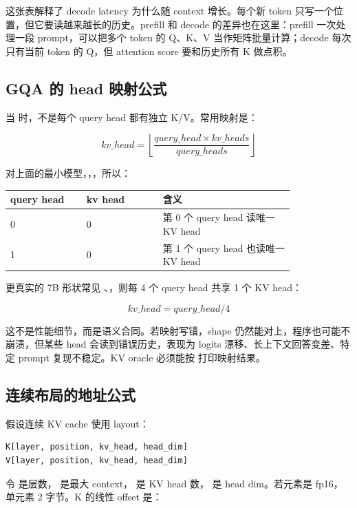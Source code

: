 这张表解释了 decode latency 为什么随 context 增长。每个新 token 只写一个位置，但它要读越来越长的历史。prefill 和 decode 的差异也在这里：prefill 一次处理一段 prompt，可以把多个 token 的 Q、K、V 当作矩阵批量计算；decode 每次只有当前 token 的 Q，但 attention score 要和历史所有 K 做点积。

\subsection{GQA 的 head 映射公式}

当  时，不是每个 query head 都有独立 K/V。常用映射是：

\[
kv\_head = \left\lfloor
  \frac{query\_head \times kv\_heads}{query\_heads}
\right\rfloor
\]

对上面的最小模型，，，所以：

\begin{center}
\begin{tabular}{p{0.22\linewidth}p{0.22\linewidth}p{0.38\linewidth}}
\toprule
query head & kv head & 含义 \\
\midrule
0 & 0 & 第 0 个 query head 读唯一 KV head \\
1 & 0 & 第 1 个 query head 也读唯一 KV head \\
\bottomrule
\end{tabular}
\end{center}

更真实的 7B 形状常见 、，则每 4 个 query head 共享 1 个 KV head：

\[
kv\_head = query\_head / 4
\]

这不是性能细节，而是语义合同。若映射写错，shape 仍然能对上，程序也可能不崩溃，但某些 head 会读到错误历史，表现为 logits 漂移、长上下文回答变差、特定 prompt 复现不稳定。KV oracle 必须能按  打印映射结果。

\subsection{连续布局的地址公式}

假设连续 KV cache 使用 layout：

\begin{lstlisting}[numbers=none,caption={连续 KV cache layout}]
K[layer, position, kv_head, head_dim]
V[layer, position, kv_head, head_dim]
\end{lstlisting}

令  是层数， 是最大 context， 是 KV head 数， 是 head dim。若元素是 fp16，单元素 2 字节。K 的线性 offset 是：

